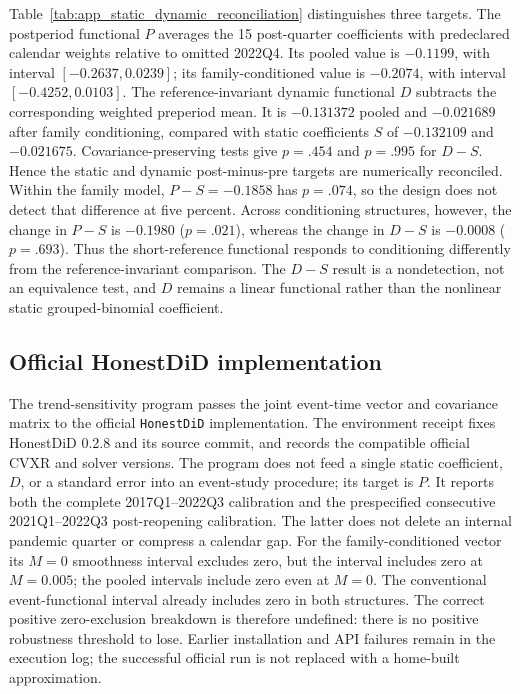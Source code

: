Table~\ref{tab:app_static_dynamic_reconciliation} distinguishes three targets.
The postperiod functional $P$ averages the 15 post-quarter coefficients with
predeclared calendar weights relative to omitted 2022Q4.  Its pooled value is
$-0.1199$, with interval $[-0.2637,0.0239]$; its family-conditioned value is
$-0.2074$, with interval $[-0.4252,0.0103]$.  The reference-invariant dynamic
functional $D$ subtracts the corresponding weighted preperiod mean.  It is
$-0.131372$ pooled and $-0.021689$ after family conditioning, compared with
static coefficients $S$ of $-0.132109$ and $-0.021675$.  Covariance-preserving
tests give $p=.454$ and $p=.995$ for $D-S$.  Hence the static and dynamic
post-minus-pre targets are numerically reconciled.  Within the family model,
$P-S=-0.1858$ has $p=.074$, so the design does not detect that difference at
five percent.  Across conditioning structures, however, the change in $P-S$ is
$-0.1980$ ($p=.021$), whereas the change in $D-S$ is $-0.0008$ ($p=.693$).
Thus the short-reference functional responds to conditioning differently from
the reference-invariant comparison.  The $D-S$ result is a nondetection, not an
equivalence test, and $D$ remains a linear functional rather than the nonlinear
static grouped-binomial coefficient.



\subsection{Official HonestDiD implementation}

The trend-sensitivity program passes the joint event-time vector and covariance matrix to the official \texttt{HonestDiD} implementation.  The environment receipt fixes HonestDiD 0.2.8 and its source commit, and records the compatible official CVXR and solver versions.  The program does not feed a single static coefficient, $D$, or a standard error into an event-study procedure; its target is $P$.  It reports both the complete 2017Q1--2022Q3 calibration and the prespecified consecutive 2021Q1--2022Q3 post-reopening calibration.  The latter does not delete an internal pandemic quarter or compress a calendar gap.  For the family-conditioned vector its $M=0$ smoothness interval excludes zero, but the interval includes zero at $M=0.005$; the pooled intervals include zero even at $M=0$.  The conventional event-functional interval already includes zero in both structures.  The correct positive zero-exclusion breakdown is therefore undefined: there is no positive robustness threshold to lose.  Earlier installation and API failures remain in the execution log; the successful official run is not replaced with a home-built approximation.

